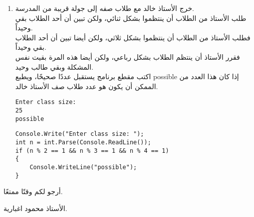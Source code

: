 ﻿\documentclass[12pt]{article}
\begin{document}
\begin{enumerate}[itemsep=3em]
\clearpage
\item
خرج الأستاذ خالد مع طلاب صفه إلى جولة قريبة من المدرسة. \\
طلب الأستاذ من الطلاب أن ينتظموا بشكل ثنائي، ولكن تبين أن أحد الطلاب بقي وحيداً. \\
فطلب الأستاذ من الطلاب أن ينتظموا بشكل ثلاثي، ولكن أيضا تبين أن أحد الطلاب بقي وحيداً. \\
فقرر الأستاذ أن ينتظم الطلاب بشكل رباعي، ولكن أيضا هذه المرة بقيت نفس المشكلة وبقي طالب وحيد. \\
اكتب مقطع برنامج يستقبل عددًا صحيحًا، ويطبع \textenglish{possible} إذا كان هذا العدد من الممكن أن يكون هو عدد طلاب صف الأستاذ خالد.
\ifdetailed
\begin{boxExample}
\begin{english}
\begin{verbatim}
Enter class size:
25
possible
\end{verbatim}
\end{english}
\end{boxExample}
\fi
\ifwithsols
\begin{boxSolution}
\begin{english}
\begin{verbatim}
Console.Write("Enter class size: ");
int n = int.Parse(Console.ReadLine());
if (n % 2 == 1 && n % 3 == 1 && n % 4 == 1)
{
    Console.WriteLine("possible");
}
\end{verbatim}
\end{english}
\end{boxSolution}
\fi

\end{enumerate}


\vspace{1cm}
\begin{flushleft}
أرجو لكم وقتًا ممتعًا.

الأستاذ محمود اغبارية.
\end{flushleft}
\end{document}

